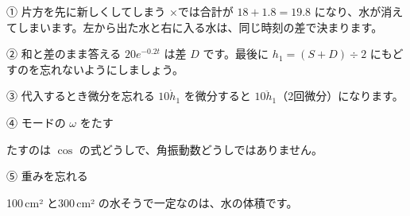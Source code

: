 \begin{tsumazuki}{① 片方を先に新しくしてしまう}
×では合計が $18+1.8=19.8$ になり、水が消えてしまいます。左から出た水と右に入る水は、同じ時刻の差で決まります。
\end{tsumazuki}

\begin{tsumazuki}{② 和と差のまま答える}
$20e^{-0.2t}$ は差 $D$ です。最後に $h_1=(S+D)\div2$ にもどすのを忘れないようにしましょう。
\end{tsumazuki}

\begin{tsumazuki}{③ 代入するとき微分を忘れる}
$10\dot h_1$ を微分すると $10\ddot h_1$（2回微分）になります。
\end{tsumazuki}

\noindent\begin{minipage}[t]{0.485\linewidth}\vspace{0pt}
\begin{tsumazuki}{④ モードの $\omega$ をたす}
\raggedright{}
たすのは $\cos$ の式どうしで、角振動数どうしではありません。
\end{tsumazuki}
\end{minipage}\hfill
\begin{minipage}[t]{0.485\linewidth}\vspace{0pt}
\begin{tsumazuki}{⑤ 重みを忘れる}
\raggedright{}
100\,cm² と300\,cm² の水そうで一定なのは、水の体積です。
\end{tsumazuki}
\end{minipage}

